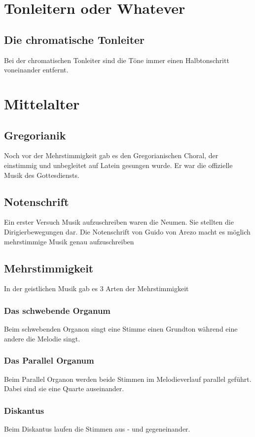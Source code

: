 \documentclass{article}
\begin{document}
\section*{Tonleitern oder Whatever}
\subsection*{Die chromatische Tonleiter}
Bei der chromatischen Tonleiter sind die Töne immer einen Halbtonschritt
voneinander entfernt.
\section*{Mittelalter}
\subsection*{Gregorianik}
Noch vor der Mehrstimmigkeit gab es den Gregorianischen
Choral, der einstimmig und unbegleitet auf Latein gesungen wurde. Er war die
offizielle Musik des Gottesdiensts.

\subsection*{Notenschrift}
Ein erster Versuch Musik aufzuschreiben waren die Neumen.
Sie stellten die Dirigierbewegungen dar.
Die Notenschrift von Guido von Arezo macht es möglich
mehrstimmige Musik genau aufzuschreiben

\subsection*{Mehrstimmigkeit}
In der geistlichen Musik gab es 3 Arten der Mehrstimmigkeit
\subsubsection*{Das schwebende Organum}
Beim schwebenden Organon singt eine Stimme einen Grundton
während eine andere die Melodie singt.
\subsubsection*{Das Parallel Organum}
Beim Parallel Organon werden beide Stimmen im Melodieverlauf
parallel geführt. Dabei sind sie eine Quarte auseinander.
\subsubsection*{Diskantus}
Beim Diskantus laufen die Stimmen aus - und gegeneinander.
\end{document}
